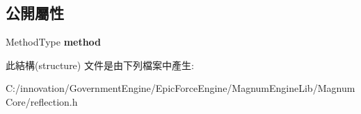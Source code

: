 \subsection*{公開屬性}
\begin{DoxyCompactItemize}
\item 
Method\+Type {\bfseries method}\hypertarget{structagm_1_1reflection_1_1____static__callable__void0_____a0b52ba67353b42ef2096c5ec91a1e67c}{}\label{structagm_1_1reflection_1_1____static__callable__void0_____a0b52ba67353b42ef2096c5ec91a1e67c}

\end{DoxyCompactItemize}


此結構(structure) 文件是由下列檔案中產生\+:\begin{DoxyCompactItemize}
\item 
C\+:/innovation/\+Government\+Engine/\+Epic\+Force\+Engine/\+Magnum\+Engine\+Lib/\+Magnum\+Core/reflection.\+h\end{DoxyCompactItemize}
